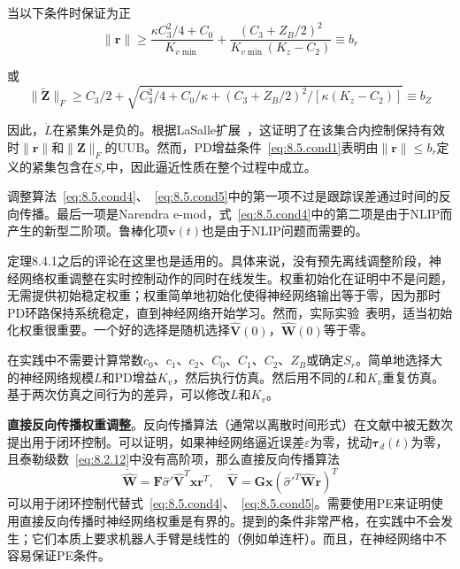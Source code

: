 \documentclass[12pt,a4paper]{ctexart}
\begin{document}
当以下条件时保证为正
\begin{equation}\label{eq:8.5.bound10}
\|\bm{r}\| \geq \frac{\kappa C_3^2/4 + C_0}{K_{v\min}} + \frac{(C_3+Z_B/2)^2}{K_{v\min}(K_z-C_2)} \equiv b_r
\end{equation}

或
\begin{equation}\label{eq:8.5.bound11}
\|\tilde{\bm{Z}}\|_F \geq C_3/2 + \sqrt{C_3^2/4 + C_0/\kappa + (C_3+Z_B/2)^2/[\kappa(K_z-C_2)]} \equiv b_Z
\end{equation}

因此，$\dot{L}$在紧集外是负的。根据LaSalle扩展~\cite{lewis1993}，这证明了在该集合内控制保持有效时$\|\bm{r}\|$和$\|\bm{Z}\|_F$的UUB。然而，PD增益条件~\eqref{eq:8.5.cond1}表明由$\|\bm{r}\| \leq b_r$定义的紧集包含在$S_r$中，因此逼近性质在整个过程中成立。

调整算法~\eqref{eq:8.5.cond4}、~\eqref{eq:8.5.cond5}中的第一项不过是跟踪误差通过时间的反向传播。最后一项是Narendra e-mod，式~\eqref{eq:8.5.cond4}中的第二项是由于NLIP而产生的新型二阶项。鲁棒化项$\bm{v}(t)$也是由于NLIP问题而需要的。

定理8.4.1之后的评论在这里也是适用的。具体来说，没有预先离线调整阶段，神经网络权重调整在实时控制动作的同时在线发生。权重初始化在证明中不是问题，无需提供初始稳定权重；权重简单地初始化使得神经网络输出等于零，因为那时PD环路保持系统稳定，直到神经网络开始学习。然而，实际实验~\cite{gutierrez1998}表明，适当初始化权重很重要。一个好的选择是随机选择$\hat{\bm{V}}(0)$，$\hat{\bm{W}}(0)$等于零。

在实践中不需要计算常数$c_0$、$c_1$、$c_2$、$C_0$、$C_1$、$C_2$、$Z_B$或确定$S_r$。简单地选择大的神经网络规模$L$和PD增益$K_v$，然后执行仿真。然后用不同的$L$和$K_v$重复仿真。基于两次仿真之间行为的差异，可以修改$L$和$K_v$。

\textbf{直接反向传播权重调整}。反向传播算法（通常以离散时间形式）在文献中被无数次提出用于闭环控制。可以证明，如果神经网络逼近误差$\varepsilon$为零，扰动$\bm{\tau}_d(t)$为零，且泰勒级数~\eqref{eq:8.2.12}中没有高阶项，那么直接反向传播算法
\begin{equation}\label{eq:8.5.7}
\dot{\hat{\bm{W}}} = \bm{F}\hat{\sigma}'\hat{\bm{V}}^T\bm{x}\bm{r}^T, \quad \dot{\hat{\bm{V}}} = \bm{G}\bm{x}(\hat{\sigma}'^T\hat{\bm{W}}\bm{r})^T
\end{equation}
可以用于闭环控制代替式~\eqref{eq:8.5.cond4}、~\eqref{eq:8.5.cond5}。需要使用PE来证明使用直接反向传播时神经网络权重是有界的。提到的条件非常严格，在实践中不会发生；它们本质上要求机器人手臂是线性的（例如单连杆）。而且，在神经网络中不容易保证PE条件。
\end{document}
